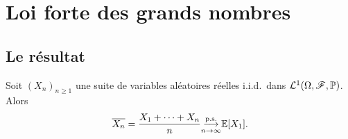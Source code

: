 

\section{Loi forte des grands nombres} %

\subsection{Le résultat} %

\begin{theorem}
    Soit \({(X_n)}_{n\geq 1}\) une suite de variables aléatoires
    réelles i.i.d.\ dans \(\mathcal L^1(\Omega, \mathscr{F}, \mathbb{P})\).
    Alors
    \begin{equation*}
        \overline{X_n} = \frac{X_1 + \cdots + X_n}{n} \underset{n\to\infty}{{\overset{\text{p.s.}}{\longrightarrow}}} \mathbb{E}[X_1].
    \end{equation*}
\end{theorem}